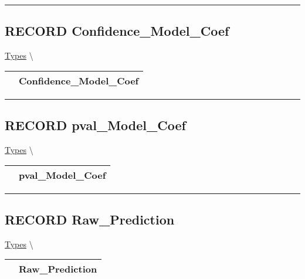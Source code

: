 \par


\rule{\linewidth}{0.5pt}
\subsection*{\textsf{\colorbox{headtoc}{\color{white} RECORD}
Confidence\_Model\_Coef}}

\hypertarget{ecldoc:types.confidence_model_coef}{}
\hspace{0pt} \hyperlink{ecldoc:Types}{Types} \textbackslash 

{\renewcommand{\arraystretch}{1.5}
\begin{tabularx}{\textwidth}{|>{\raggedright\arraybackslash}l|X|}
\hline
\hspace{0pt}\mytexttt{\color{red} } & \textbf{Confidence\_Model\_Coef} \\
\hline
\end{tabularx}
}

\par


\rule{\linewidth}{0.5pt}
\subsection*{\textsf{\colorbox{headtoc}{\color{white} RECORD}
pval\_Model\_Coef}}

\hypertarget{ecldoc:types.pval_model_coef}{}
\hspace{0pt} \hyperlink{ecldoc:Types}{Types} \textbackslash 

{\renewcommand{\arraystretch}{1.5}
\begin{tabularx}{\textwidth}{|>{\raggedright\arraybackslash}l|X|}
\hline
\hspace{0pt}\mytexttt{\color{red} } & \textbf{pval\_Model\_Coef} \\
\hline
\end{tabularx}
}

\par


\rule{\linewidth}{0.5pt}
\subsection*{\textsf{\colorbox{headtoc}{\color{white} RECORD}
Raw\_Prediction}}

\hypertarget{ecldoc:types.raw_prediction}{}
\hspace{0pt} \hyperlink{ecldoc:Types}{Types} \textbackslash 

{\renewcommand{\arraystretch}{1.5}
\begin{tabularx}{\textwidth}{|>{\raggedright\arraybackslash}l|X|}
\hline
\hspace{0pt}\mytexttt{\color{red} } & \textbf{Raw\_Prediction} \\
\hline
\end{tabularx}
}

